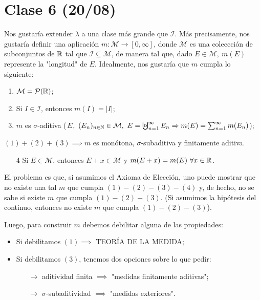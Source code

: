 \section{Clase 6 (20/08)}

Nos gustaría extender $\lambda$ a una clase más grande que $\mathcal{I}$. Más precisamente, nos gustaría definir una aplicación $m : \mathcal{M} \to [0,\infty]$, donde $\mathcal{M}$ es una coleccción de subconjuntos de $\mathbb{R}$ tal que $\mathcal{I} \subseteq \mathcal{M}$, de manera tal que, dado $E \in \mathcal{M},\ m(E)$ represente la "longitud" de $E$. Idealmente, nos gustaría que $m$ cumpla lo siguiente:
\begin{enumerate}
	\item $\mathcal{M} = \mathcal{P}(\mathbb{R})$;

	\item Si $I \in \mathcal{I}$, entonces $m(I) = |I|$;

	\item $m$ es $\sigma$-aditiva ($E,\ (E_n)_{n\in\N}\in \mathcal{M},\ E = \textbigcupd_{n=1}^{\infty} E_n \implies m(E) = \sum_{n=1}^{\infty} m(E_n)$);
\end{enumerate}
\begin{ex}
	$(1)+(2)+(3) \implies m$ es monótona, $\sigma$-subaditiva y finitamente aditiva. 
\end{ex}
\begin{enumerate}
	\item[4] Si $E \in \mathcal{M}$, entonces $E + x \in \mathcal{M}$ y $m(E + x) = m(E)\ \forall x \in \mathbb{R}$.
\end{enumerate}
\noindent El problema es que, si asumimos el Axioma de Elección, uno puede mostrar que no existe una tal $m$ que cumpla $(1)-(2)-(3)-(4)$ y, de hecho, no se sabe si existe $m$ que cumpla $(1)-(2)-(3)$. (Si asumimos la hipótesis del continuo, entonces no existe $m$ que cumpla $(1)-(2)-(3)$). \par
\medskip
\noindent Luego, para construir $m$ debemos debilitar alguna de las propiedades:
\begin{itemize}
	\item Si debilitamos $(1) \implies$ TEORÍA DE LA MEDIDA;
	
	\item Si debilitamos $(3)$, tenemos dos opciones sobre lo que pedir:
	\begin{itemize}
		\item[$\rightarrow$] aditividad finita $ \implies$ "medidas finitamente aditivas";
	
		\item[$\rightarrow$] $\sigma$-subaditividad $\implies$ "medidas exteriores".
	\end{itemize}
\end{itemize}

